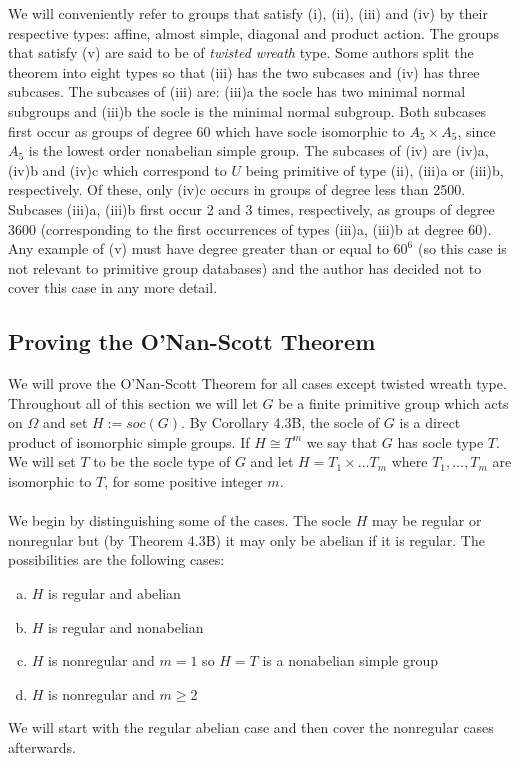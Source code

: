 \documentclass[]{article}
\theoremstyle{definition}
\begin{document}
We will conveniently refer to groups that satisfy (i), (ii), (iii) and (iv) by their respective types: affine, almost simple, diagonal and product action. The groups that satisfy (v) are said to be of \emph{twisted wreath} type. Some authors split the theorem into eight types so that (iii) has the two subcases and (iv) has three subcases. The subcases of (iii) are: (iii)a the socle has two minimal normal subgroups and (iii)b the socle is the minimal normal subgroup. Both subcases first occur as groups of degree 60 which have socle isomorphic to $A_5 \times A_5$, since $A_5$ is the lowest order nonabelian simple group. The subcases of (iv) are (iv)a, (iv)b and (iv)c which correspond to $U$ being primitive of type (ii), (iii)a or (iii)b, respectively. Of these, only (iv)c occurs in groups of degree less than 2500. Subcases (iii)a, (iii)b first occur 2 and 3 times, respectively, as groups of degree 3600 (corresponding to the first occurrences of types (iii)a, (iii)b at degree 60). Any example of (v) must have degree greater than or equal to $60^6$ (so this case is not relevant to primitive group databases) and the author has decided not to cover this case in any more detail.

\subsection{Proving the O'Nan-Scott Theorem}
We will prove the O'Nan-Scott Theorem for all cases except twisted wreath type. Throughout all of this section we will let $G$ be a finite primitive group which acts on $\Omega$ and set $H:=soc(G)$. By Corollary 4.3B, the socle of $G$ is a direct product of isomorphic simple groups. If $H \cong T^m$ we say that $G$ has socle type $T$. We will set $T$ to be the socle type of $G$ and let $H = T_1 \times \dots T_m$ where $T_1,\dots,T_m$ are isomorphic to $T$, for some positive integer $m$.
\\
\\
We begin by distinguishing some of the cases. The socle $H$ may be regular or nonregular but (by Theorem 4.3B) it may only be abelian if it is regular. The possibilities are the following cases:
\begin{enumerate}[(a)]
	\item $H$ is regular and abelian
	\vspace{-0.2cm}	\item $H$ is regular and nonabelian
	\vspace{-0.2cm}	\item $H$ is nonregular and $m=1$ so $H = T$ is a nonabelian simple group
	\vspace{-0.2cm} \item $H$ is nonregular and $m\geq2$
\end{enumerate}
We will start with the regular abelian case and then cover the nonregular cases afterwards.
\end{document}

